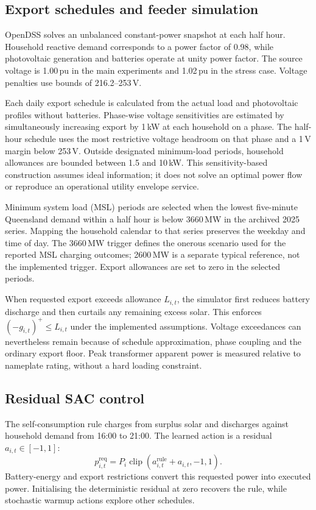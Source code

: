 \subsection{Export schedules and feeder simulation}
OpenDSS solves an unbalanced constant-power snapshot at each half hour. Household reactive demand corresponds to a power factor of 0.98, while photovoltaic generation and batteries operate at unity power factor. The source voltage is 1.00\,pu in the main experiments and 1.02\,pu in the stress case. Voltage penalties use bounds of 216.2--253\,V.

Each daily export schedule is calculated from the actual load and photovoltaic profiles without batteries. Phase-wise voltage sensitivities are estimated by simultaneously increasing export by 1\,kW at each household on a phase. The half-hour schedule uses the most restrictive voltage headroom on that phase and a 1\,V margin below 253\,V. Outside designated minimum-load periods, household allowances are bounded between 1.5 and 10\,kW. This sensitivity-based construction assumes ideal information; it does not solve an optimal power flow or reproduce an operational utility envelope service.

Minimum system load (MSL) periods are selected when the lowest five-minute Queensland demand within a half hour is below 3660\,MW in the archived 2025 series. Mapping the household calendar to that series preserves the weekday and time of day. The 3660\,MW trigger defines the onerous scenario used for the reported MSL charging outcomes; 2600\,MW is a separate typical reference, not the implemented trigger. Export allowances are set to zero in the selected periods.

When requested export exceeds allowance $L_{i,t}$, the simulator first reduces battery discharge and then curtails any remaining excess solar. This enforces $(-g_{i,t})^+\leq L_{i,t}$ under the implemented assumptions. Voltage exceedances can nevertheless remain because of schedule approximation, phase coupling and the ordinary export floor. Peak transformer apparent power is measured relative to nameplate rating, without a hard loading constraint.

\subsection{Residual SAC control}
The self-consumption rule charges from surplus solar and discharges against household demand from 16:00 to 21:00. The learned action is a residual $a_{i,t}\in[-1,1]$:
\begin{equation}
p^{\mathrm{req}}_{i,t}=P_i\operatorname{clip}\left(a^{\mathrm{rule}}_{i,t}+a_{i,t},-1,1\right).
\end{equation}
Battery-energy and export restrictions convert this requested power into executed power. Initialising the deterministic residual at zero recovers the rule, while stochastic warmup actions explore other schedules.

